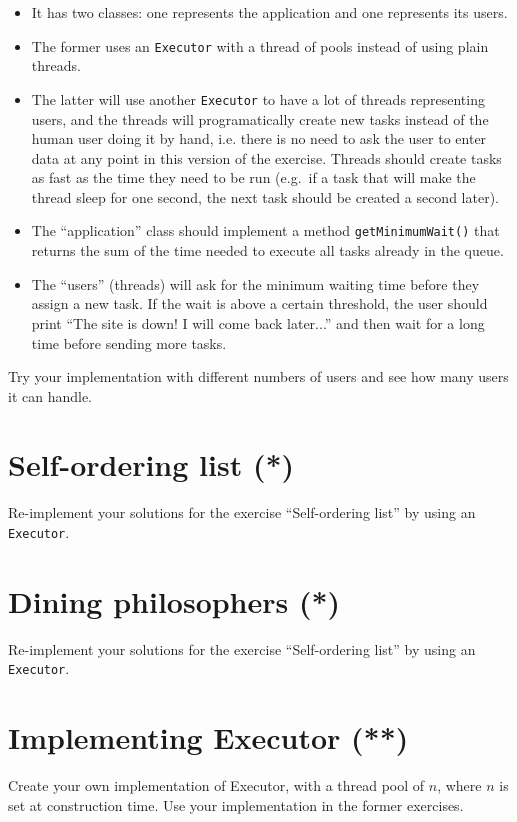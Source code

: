 \documentclass{article}
\begin{document}
\begin{itemize}
\item It has two classes: one represents the application and one
  represents its users.
\item The former uses an \verb+Executor+ with a thread of pools
  instead of using plain threads.
\item The latter will use another \verb+Executor+ to have a lot of
  threads representing users, and the threads will programatically
  create new tasks instead of the human user doing it by hand,
  i.e. there is no need to ask the user to enter data at any point in
  this version of the exercise. Threads should create tasks as
  fast as the time they need to be run (e.g.~if a task that will make
  the thread sleep for one second, the next task should be created
  a second later). 
\item The ``application'' class should implement a method
  \verb+getMinimumWait()+ that returns the sum of the time needed to
  execute all tasks already in the queue.
\item The ``users'' (threads) will ask for the minimum waiting time
  before they assign a new task. If the wait is above a certain
  threshold, the user should print ``The site is down! I will
  come back later...'' and then wait for a long time before sending
  more tasks. 
\end{itemize}

Try your implementation with different numbers of users and see how
many users it can handle. 

\section{Self-ordering list (*)}
\label{sec:self-ordering-list--}

Re-implement your solutions for the exercise ``Self-ordering list'' by
using an \verb+Executor+. 

\section{Dining philosophers (*)}
\label{sec:dining-philosophers}

Re-implement your solutions for the exercise ``Self-ordering list'' by
using an \verb+Executor+. 

\section{Implementing Executor (**)}
\label{sec:impl-exec-}

Create your own implementation of Executor, with a thread pool of $n$,
where $n$ is set at construction time. Use your implementation in the
former exercises. 
\end{document}
